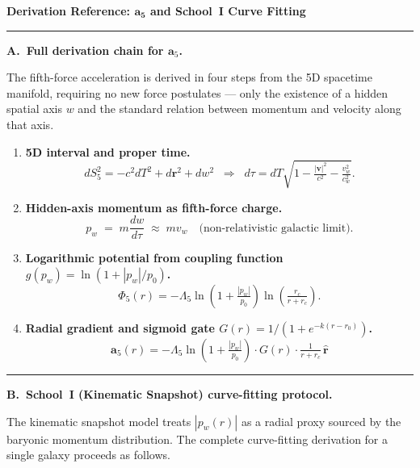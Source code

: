 \documentclass[11pt,a4paper]{article}
\newcommand{\pw}{p_w}                        %
\newcommand{\Lf}{\Lambda_5}                  %
\newcommand{\afive}{\mathbf{a}_5}            %
\newcommand{\rhat}{\hat{\mathbf{r}}}         %
\begin{document}
\thispagestyle{fancy}
\vspace*{0.6cm}
\begin{center}
\begin{minipage}{0.90\textwidth}

\textbf{\large Derivation Reference: $\boldsymbol{\mathbf{a}_5}$ and School~I Curve Fitting}

\smallskip\rule{\textwidth}{0.5pt}\smallskip

\textbf{A.\ Full derivation chain for $\afive$.}

\smallskip
\noindent The fifth-force acceleration is derived in four steps from the
5D spacetime manifold, requiring no new force postulates --- only the
existence of a hidden spatial axis $w$ and the standard relation between
momentum and velocity along that axis.

\begin{enumerate}[leftmargin=1.8em,itemsep=6pt]

\item \textbf{5D interval and proper time.}
\[
  dS_5^2 = -c^2dT^2 + d\mathbf{r}^2 + dw^2
  \;\;\Rightarrow\;\;
  d\tau = dT\sqrt{1 - \tfrac{|\mathbf{v}|^2}{c^2} - \tfrac{v_w^2}{c_w^2}} .
\]

\item \textbf{Hidden-axis momentum as fifth-force charge.}
\[
  \pw \;=\; m\frac{dw}{d\tau} \;\approx\; mv_w
  \quad\text{(non-relativistic galactic limit).}
\]

\item \textbf{Logarithmic potential from coupling function $g(\pw) = \ln(1+|\pw|/p_0)$.}
\[
  \Phi_5(r) = -\Lf\ln\!\left(1+\tfrac{|\pw|}{p_0}\right)\ln\!\left(\tfrac{r_c}{r+r_c}\right).
\]

\item \textbf{Radial gradient and sigmoid gate $G(r) = 1/(1+e^{-k(r-r_0)})$.}
\[
  \boxed{
    \afive(r) = -\Lf\ln\!\left(1+\tfrac{|\pw|}{p_0}\right)
    \cdot G(r)
    \cdot \tfrac{1}{r+r_c}\,\rhat
  }
\]
\end{enumerate}

\medskip
\rule{\textwidth}{0.4pt}
\smallskip

\textbf{B.\ School~I (Kinematic Snapshot) curve-fitting protocol.}

\smallskip
\noindent
The kinematic snapshot model treats $|\pw(r)|$ as a radial proxy sourced
by the baryonic momentum distribution.  The complete curve-fitting derivation
for a single galaxy proceeds as follows.


\end{minipage}
\end{center}
\end{document}

